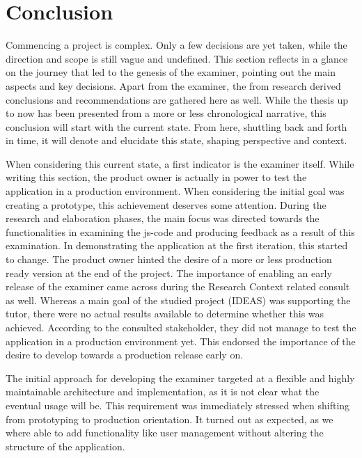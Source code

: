\chapter{Conclusion}

Commencing a project is complex. Only a few decisions are yet taken, while
the direction and scope is still vague and undefined. This section reflects in a 
glance on the journey that led to the genesis of the \gls{examiner}, pointing 
out the main aspects and key decisions. Apart from the \gls{examiner}, the from 
research derived conclusions and recommendations are gathered here as well. 
While the thesis up to now has been presented from a more or less chronological
narrative, this conclusion will start with the current state. From
here, shuttling back and forth in time,
it will denote and elucidate this state,
shaping perspective and context.


When considering this current state, a first indicator is the \gls{examiner}
itself. While writing this section, the product owner is actually in power to
test the application in a production environment. When considering the
initial goal was creating a prototype, this achievement deserves some attention.
During the research and elaboration phases, the main focus was directed towards 
the functionalities in examining the \gls{js-code} and producing \gls{feedback}
as a result of this examination. In demonstrating the application at the
first iteration, this started to change. The product owner hinted the desire of
a more or less production ready version at the end of the project. The 
importance of enabling an early release of the \gls{examiner} came across
during the Research Context related consult as well. Whereas a main goal of the
studied project (IDEAS) was supporting the \gls{tutor}, there were no actual
results available to determine whether this was achieved. According to the
consulted stakeholder, they did not manage to test the application in a 
production environment yet. This endorsed the importance of the desire to 
develop towards a production release early on.


The initial approach for developing the \gls{examiner} targeted at a flexible
and highly maintainable architecture and implementation, as it is not clear
what the eventual usage will be. This requirement was immediately stressed
when shifting from prototyping to production orientation. It turned out as
expected, as we where able to add functionality like user management without 
altering the structure of the application.


